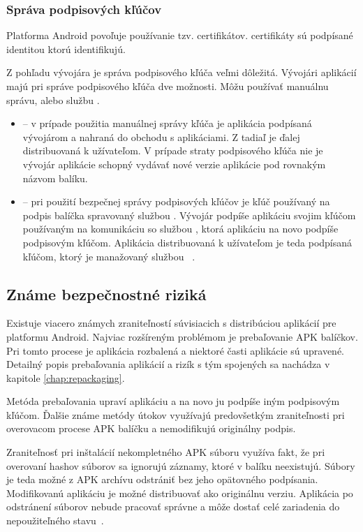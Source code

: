 \subsubsection{\textbf{Správa podpisových kľúčov}}
Platforma Android povoľuje používanie tzv.  certifikátov.  certifikáty sú podpísané identitou ktorú identifikujú. 

Z pohľadu vývojára je správa podpisového kľúča veľmi dôležitá. Vývojári aplikácií majú pri správe podpisového kľúča dve možnosti. Môžu používať manuálnu správu, alebo službu . 
\begin{itemize}
	\item {} -- v prípade použitia manuálnej správy kľúča je aplikácia podpísaná vývojárom a nahraná do obchodu s aplikáciami. Z tadiaľ je ďalej distribuovaná k užívateľom. V prípade straty podpisového kľúča nie je vývojár aplikácie schopný vydávať nové verzie aplikácie pod rovnakým názvom balíku.
	\item {} -- pri použití bezpečnej správy podpisových kľúčov  je kľúč používaný na podpis balíčka spravovaný službou  . Vývojár podpíše aplikáciu svojim kľúčom používaným na komunikáciu so službou  , ktorá aplikáciu na novo podpíše podpisovým kľúčom. Aplikácia distribuovaná k užívateľom je teda podpísaná kľúčom, ktorý je manažovaný službou ~\cite{NT0FrzQIkOAYbG2G}. 
\end{itemize}


\subsection{Známe bezpečnostné riziká}

Existuje viacero známych zraniteľností súvisiacich s distribúciou aplikácií  pre platformu Android. Najviac rozšíreným problémom je prebaľovanie APK balíčkov. Pri tomto procese je aplikácia rozbalená a niektoré časti aplikácie sú upravené. Detailný popis prebaľovania aplikácií a rizík s tým spojených sa nachádza v kapitole \ref{chap:repackaging}.

Metóda prebaľovania upraví aplikáciu a na novo ju podpíše iným podpisovým kľúčom. Ďalšie známe metódy útokov využívajú predovšetkým zraniteľnosti pri overovacom procese APK balíčku a nemodifikujú originálny podpis. 

Zraniteľnosť pri inštalácií nekompletného APK súboru využíva fakt, že pri overovaní hashov súborov sa ignorujú záznamy, ktoré v balíku neexistujú. Súbory je teda možné z APK archívu odstrániť bez jeho opätovného podpísania. Modifikovanú aplikáciu je možné distribuovať ako originálnu verziu. Aplikácia po odstránení súborov nebude pracovať správne a môže dostať celé zariadenia do nepoužiteľného stavu~\cite{A7idcou1z6WqKvQZ}.

